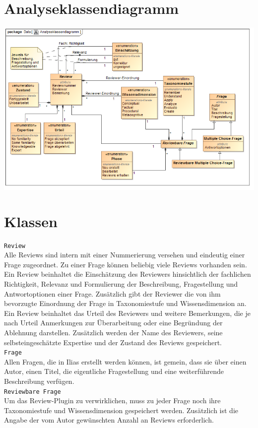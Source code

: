 \documentclass[a4paper]{scrreprt}
\begin{document}
\section{Analyseklassendiagramm}
\includegraphics[width=1.0\textwidth]{Class_Diagram__Analyseklassendiagramm.png}
\label{Analyseklassendiagramm}
 
\section{Klassen}
\texttt{Review}\\
Alle Reviews sind intern mit einer Nummerierung versehen und eindeutig einer Frage zugeordnet. Zu einer Frage können beliebig viele Reviews vorhanden sein. Ein Review beinhaltet die Einschätzung des Reviewers hinsichtlich der fachlichen Richtigkeit, Relevanz und Formulierung der Beschreibung, Fragestellung und Antwortoptionen einer Frage. Zusätzlich gibt der Reviewer die von ihm bevorzugte Einordnung der Frage in Taxonomiestufe und Wissensdimension an. Ein Review beinhaltet das Urteil des Reviewers und weitere Bemerkungen, die je nach Urteil Anmerkungen zur Überarbeitung oder eine Begründung der Ablehnung darstellen. Zusätzlich werden der Name des Reviewers, seine selbsteingeschätzte Expertise und der Zustand des Reviews gespeichert.\\
\texttt{Frage}\\
Allen Fragen, die in Ilias erstellt werden können, ist gemein, dass sie über einen Autor, einen Titel, die eigentliche Fragestellung und eine weiterführende Beschreibung verfügen.\\

\texttt{Reviewbare Frage}\\
Um das Review-Plugin zu verwirklichen, muss zu jeder Frage noch ihre Taxonomiestufe und Wissensdimension gespeichert werden. Zusätzlich ist die Angabe der vom Autor gewünschten Anzahl an Reviews erforderlich.\\
\end{document}
